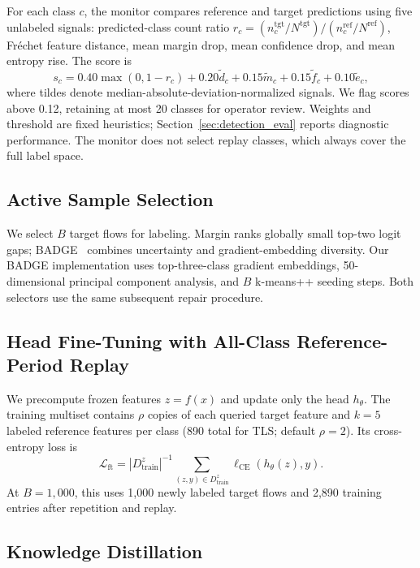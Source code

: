 \documentclass[journal]{IEEEtran}
\begin{document}
For each class $c$, the monitor compares reference and target predictions using five unlabeled signals: predicted-class count ratio $r_c=(n_c^{\mathrm{tgt}}/N^{\mathrm{tgt}})/(n_c^{\mathrm{ref}}/N^{\mathrm{ref}})$, Fr\'{e}chet feature distance, mean margin drop, mean confidence drop, and mean entropy rise. The score is
\begin{equation}
 s_c=0.40\max(0,1-r_c)+0.20\tilde d_c+0.15\tilde m_c+0.15\tilde f_c+0.10\tilde e_c,
\end{equation}
where tildes denote median-absolute-deviation-normalized signals. We flag scores above 0.12, retaining at most 20 classes for operator review. Weights and threshold are fixed heuristics; Section~\ref{sec:detection_eval} reports diagnostic performance. The monitor does not select replay classes, which always cover the full label space.

\subsection{Active Sample Selection}
\label{sec:sample_select}


We select $B$ target flows for labeling. Margin ranks globally small top-two logit gaps; BADGE~\cite{ash2020badge} combines uncertainty and gradient-embedding diversity. Our BADGE implementation uses top-three-class gradient embeddings, 50-dimensional principal component analysis, and $B$ k-means++ seeding steps. Both selectors use the same subsequent repair procedure.

\subsection{Head Fine-Tuning with All-Class Reference-Period Replay}
\label{sec:ft_replay}


We precompute frozen features $z=f(x)$ and update only the head $h_\theta$. The training multiset contains $\rho$ copies of each queried target feature and $k=5$ labeled reference features per class (890 total for TLS; default $\rho=2$). Its cross-entropy loss is
\begin{equation}
 \mathcal L_{\mathrm{ft}}=|D_{\mathrm{train}}^z|^{-1}\sum_{(z,y)\in D_{\mathrm{train}}^z}\ell_{\mathrm{CE}}(h_\theta(z),y).
\end{equation}
At $B=1{,}000$, this uses 1{,}000 newly labeled target flows and 2{,}890 training entries after repetition and replay.

\subsection{Knowledge Distillation}
\label{sec:distill}
\end{document}
